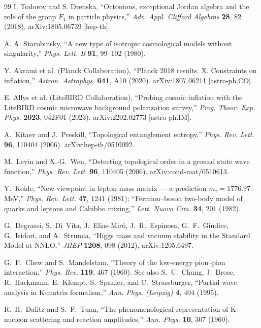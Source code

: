 \documentclass[12pt,a4paper]{article}
\theoremstyle{definition}
\begin{document}
\begin{thebibliography}{99}
I. Todorov and S. Drenska, ``Octonions, exceptional Jordan algebra and the role of the group $F_4$ in particle physics,'' \textit{Adv. Appl. Clifford Algebras} \textbf{28}, 82 (2018). arXiv:1805.06739 [hep-th].

A. A. Starobinsky, ``A new type of isotropic cosmological models without singularity,'' \textit{Phys. Lett. B} \textbf{91}, 99--102 (1980).

Y. Akrami et al. (Planck Collaboration), ``Planck 2018 results. X. Constraints on inflation,'' \textit{Astron. Astrophys.} \textbf{641}, A10 (2020). arXiv:1807.06211 [astro-ph.CO].

E. Allys et al. (LiteBIRD Collaboration), ``Probing cosmic inflation with the LiteBIRD cosmic microwave background polarization survey,'' \textit{Prog. Theor. Exp. Phys.} \textbf{2023}, 042F01 (2023). arXiv:2202.02773 [astro-ph.IM].

A.~Kitaev and J.~Preskill, ``Topological entanglement entropy,'' \textit{Phys. Rev. Lett.} \textbf{96}, 110404 (2006). arXiv:hep-th/0510092.

M.~Levin and X.-G.~Wen, ``Detecting topological order in a ground state wave function,'' \textit{Phys. Rev. Lett.} \textbf{96}, 110405 (2006). arXiv:cond-mat/0510613.

Y.~Koide, ``New viewpoint in lepton mass matrix --- a prediction $m_\tau = 1776.97$ MeV,'' \textit{Phys. Rev. Lett.} \textbf{47}, 1241 (1981); ``Fermion--boson two-body model of quarks and leptons and Cabibbo mixing,'' \textit{Lett. Nuovo Cim.} \textbf{34}, 201 (1982).

G.~Degrassi, S.~Di~Vita, J.~Elias-Mir{\'o}, J.~R.~Espinosa, G.~F.~Giudice, G.~Isidori, and A.~Strumia, ``Higgs mass and vacuum stability in the Standard Model at NNLO,'' \textit{JHEP} \textbf{1208}, 098 (2012), arXiv:1205.6497.

G.~F.~Chew and S.~Mandelstam, ``Theory of the low-energy pion--pion interaction,'' \textit{Phys. Rev.} \textbf{119}, 467 (1960).
See also S.~U.~Chung, J.~Brose, R.~Hackmann, E.~Klempt, S.~Spanier, and C.~Strassburger, ``Partial wave analysis in K-matrix formalism,'' \textit{Ann. Phys. (Leipzig)} \textbf{4}, 404 (1995).

R.~H.~Dalitz and S.~F.~Tuan, ``The phenomenological representation of K-nucleon scattering and reaction amplitudes,'' \textit{Ann. Phys.} \textbf{10}, 307 (1960).

\end{thebibliography}
\end{document}
